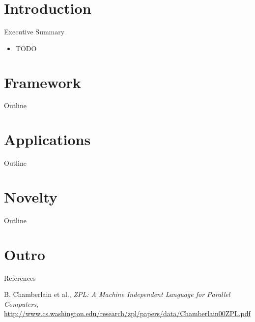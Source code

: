 \section{Introduction}

\begin{frame}{Executive Summary}
  \begin{itemize}
  \item TODO
  \end{itemize}
\end{frame}



\section{Framework}

\begin{frame}{Outline}
  \tableofcontents[current]
\end{frame}



\section{Applications}

\begin{frame}{Outline}
  \tableofcontents[current]
\end{frame}



\section{Novelty}

\begin{frame}{Outline}
  \tableofcontents[current]
\end{frame}



\section*{Outro}

\begin{frame}{References}
  \begin{thebibliography}{10}
    \beamertemplatearticlebibitems
    
    B. Chamberlain et al., {\em ZPL: A Machine Independent Language
      for Parallel Computers},
    \url{http://www.cs.washington.edu/research/zpl/papers/data/Chamberlain00ZPL.pdf}
  \end{thebibliography}
\end{frame}

